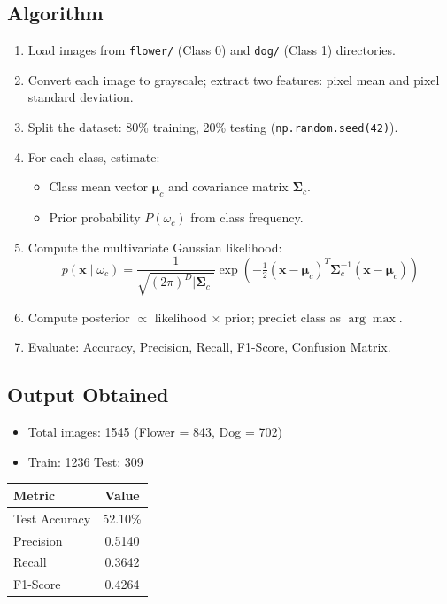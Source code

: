 \documentclass[12pt,a4paper]{article}
\begin{document}
\subsection*{Algorithm}
\begin{enumerate}[leftmargin=*, label=\arabic*.]
  \item Load images from \texttt{flower/} (Class 0) and \texttt{dog/} (Class 1) directories.
  \item Convert each image to grayscale; extract two features: pixel mean and pixel standard deviation.
  \item Split the dataset: 80\% training, 20\% testing (\texttt{np.random.seed(42)}).
  \item For each class, estimate:
    \begin{itemize}
      \item Class mean vector $\boldsymbol{\mu}_c$ and covariance matrix $\boldsymbol{\Sigma}_c$.
      \item Prior probability $P(\omega_c)$ from class frequency.
    \end{itemize}
  \item Compute the multivariate Gaussian likelihood:
    \[
      p(\mathbf{x} \mid \omega_c) = \frac{1}{\sqrt{(2\pi)^D |\boldsymbol{\Sigma}_c|}}
      \exp\!\left(-\tfrac{1}{2}(\mathbf{x}-\boldsymbol{\mu}_c)^T \boldsymbol{\Sigma}_c^{-1}(\mathbf{x}-\boldsymbol{\mu}_c)\right)
    \]
  \item Compute posterior $\propto$ likelihood $\times$ prior; predict class as $\arg\max$.
  \item Evaluate: Accuracy, Precision, Recall, F1-Score, Confusion Matrix.
\end{enumerate}

\subsection*{Output Obtained}
\begin{itemize}
  \item Total images: 1545 \quad (Flower = 843, Dog = 702)
  \item Train: 1236 \quad Test: 309
\end{itemize}

\begin{center}
\begin{tabular}{lc}
\toprule
\textbf{Metric} & \textbf{Value} \\
\midrule
Test Accuracy  & 52.10\% \\
Precision      & 0.5140  \\
Recall         & 0.3642  \\
F1-Score       & 0.4264  \\
\bottomrule
\end{tabular}
\end{center}
\end{document}
